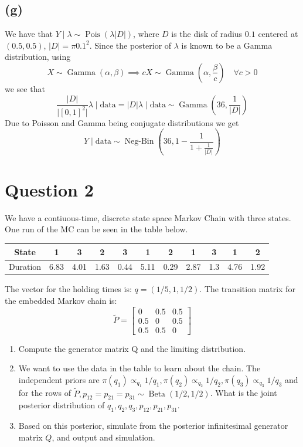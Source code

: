 \documentclass{article}
\DeclareMathOperator\Beta{Beta}
\DeclareMathOperator\Poisson{Pois}
\DeclareMathOperator\GammaDist{Gamma}
\DeclareMathOperator\NegBin{Neg-Bin}
\newcommand{\size}[1]{\lvert #1 \rvert}
\begin{document}
\subsection{(g)}
We have that $Y \mid \lambda \sim \Poisson(\lambda \lvert D \rvert)$,
where $D$ is the disk of radius $0.1$ centered at $(0.5, 0.5)$,
$\lvert D \rvert = \pi 0.1^2$.
Since the posterior of $\lambda$ is known to be a Gamma distribution, using
$$ X \sim \GammaDist(\alpha, \beta) \implies cX \sim \GammaDist(\alpha, \frac\beta c) \quad \forall c>0 $$
we see that
$$ \frac{\size{D}}{\size{[0, 1]^2}} \lambda \mid \text{data} = \size{D} \lambda \mid \text{data}
\sim \GammaDist(36, \frac1{\size{D}}) $$
Due to Poisson and Gamma being conjugate distributions we get
$$ Y \mid \text{data} \sim \NegBin(36, 1 - \frac1{1 + \frac1{\size{D}}}) $$

\section{Question 2}
We have a contiuous-time, discrete state space Markov Chain with three states.
One run of the MC can be seen in the table below.
\begin{center}
\begin{tabular}{c|c|c|c|c|c|c|c|c|c|c|}
 State & 1 & 3 & 2 & 3 & 1 & 2 & 1 & 3 & 1 & 2 \\
 \hline
 Duration & 6.83 & 4.01 & 1.63 & 0.44 & 5.11 & 0.29 & 2.87 & 1.3 & 4.76 & 1.92
\end{tabular}
\end{center}
The vector for the holding times is: $q = (1/5, 1, 1/2)$.
The transition matrix for the embedded Markov chain is:
$$ \tilde{P} = \begin{bmatrix}
0 & 0.5 & 0.5\\
0.5 & 0 & 0.5\\
0.5 & 0.5 & 0
\end{bmatrix} $$
\begin{enumerate}[label=(\alph*)]
	\item Compute the generator matrix Q and the limiting distribution.
	\item We want to use the data in the table to learn about the chain. The independent priors are $\pi(q_1) \propto_{q_1} 1/q_1, \pi(q_2) \propto_{q_2} 1/q_2, \pi(q_3) \propto_{q_3} 1/q_3$ and for the rows of $\tilde{P}, p_{12} = p_{21} = p_{31} \sim \Beta(1/2, 1/2)$. What is the joint posterior distribution of $q_1, q_2, q_3, p_{12}, p_{21}, p_{31}.$
	\item Based on this posterior, simulate from the posterior infinitesimal generator matrix $Q$, and output and simulation.
\end{enumerate}
\end{document}
